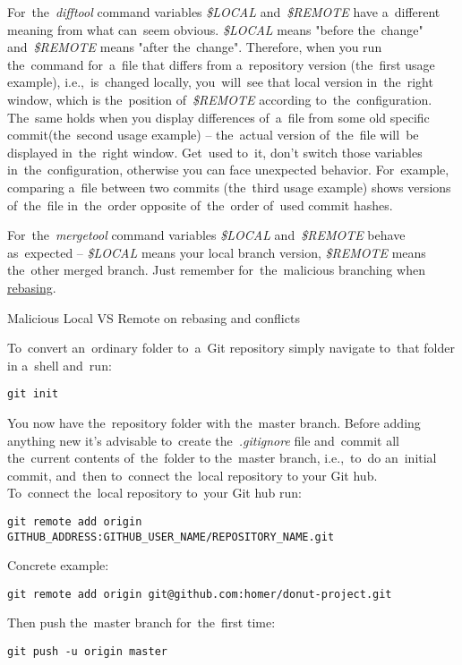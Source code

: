 \warning For~the~\textit{difftool} command variables \textit{\$LOCAL} and~\textit{\$REMOTE} have a~different meaning from what can~seem obvious.
\textit{\$LOCAL} means "before the~change" and~\textit{\$REMOTE} means "after the~change".
Therefore, when you run the~command for~a~file that differs from a~repository version (the~first usage example), i.e.,~is~changed locally, you~will~see that local version in~the~right window, which is the~position of~\textit{\$REMOTE} according to~the~configuration.
The~same holds when you display differences of~a~file from some old specific commit(the~second usage example) -- the~actual version of~the~file will~be displayed in~the~right window.
Get~used to~it, don't switch those variables in~the~configuration, otherwise you can face unexpected behavior.
For~example, comparing a~file between two commits (the~third usage example) shows versions of~the~file in~the~order opposite of~the~order of~used commit hashes.

\note For~the~\textit{mergetool} command variables \textit{\$LOCAL} and~\textit{\$REMOTE} behave as~expected -- \textit{\$LOCAL} means your local branch version, \textit{\$REMOTE} means the~other merged branch.
Just remember for~the~malicious branching when \hyperref[gitrebase]{rebasing}.
\newpage

\label{gitrebase}
\todo Malicious Local VS Remote on rebasing and conflicts

\label{initrepo}
To~convert an~ordinary folder to~a~Git repository simply navigate to~that folder in a~shell and~run:
\begin{lstlisting}[frame=no]
    git init
\end{lstlisting}
\noindent You now have the~repository folder with the~master branch.
Before adding anything new it's advisable to~create the~\textit{.gitignore} file and~commit all the~current contents of~the~folder to the~master branch, i.e.,~to~do an~initial commit, and~then to~connect the~local repository to your Git hub.\\

\noindent To~connect the~local repository to~your Git hub run:
\begin{lstlisting}[frame=no]
    git remote add origin GITHUB_ADDRESS:GITHUB_USER_NAME/REPOSITORY_NAME.git
\end{lstlisting}
\noindent Concrete example:
\begin{lstlisting}[frame=no]
    git remote add origin git@github.com:homer/donut-project.git
\end{lstlisting}
\noindent Then push the~master branch for~the~first time:
\begin{lstlisting}[frame=no]
    git push -u origin master
\end{lstlisting}

